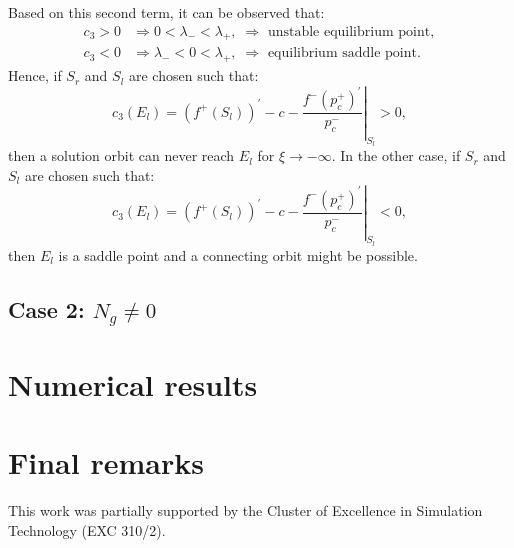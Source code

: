 \documentclass[smallextended]{svjour3}       %
\begin{document}
Based on this second term, it can be observed that:
\begin{align*}
c_3>0 &\Rightarrow 0 < \lambda_- < \lambda_+,\;\Rightarrow \text{ unstable equilibrium point}, \\
c_3<0 &\Rightarrow \lambda_- < 0 < \lambda_+,\;\Rightarrow \text{ equilibrium saddle point}.
\end{align*}
Hence, if $S_r$ and $S_l$ are chosen such that:
$$
c_3\left( E_l \right) = \left( f^+\left( S_l \right) \right)^\prime - c - \left. \frac{ f^- \left( p_c^+ \right)^\prime}{p_c^-} \right|_{S_l} > 0,
$$
then a solution orbit can never reach $E_l$ for $\xi \rightarrow -\infty$. In the other case, if $S_r$ and $S_l$ are chosen such that:
$$
c_3\left( E_l \right) = \left( f^+\left( S_l \right) \right)^\prime - c - \left. \frac{ f^- \left( p_c^+ \right)^\prime}{p_c^-} \right|_{S_l} < 0,
$$
then $E_l$ is a saddle point and a connecting orbit might be possible.

\subsection{Case 2: $N_g \neq 0$}

\section{Numerical results}

\section{Final remarks}


\begin{acknowledgements}
This work was partially supported by the Cluster of Excellence in Simulation Technology (EXC 310/2).
\end{acknowledgements}

     
  
\nocite{*}
\end{document}
